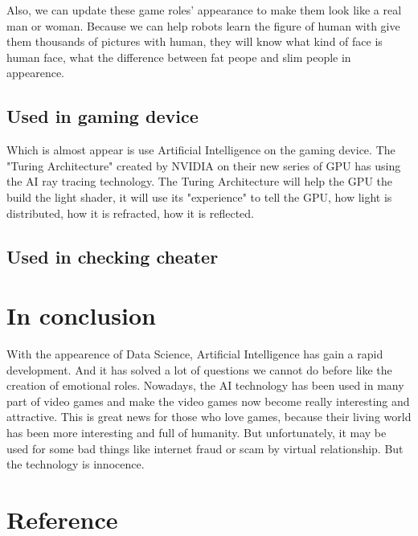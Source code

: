 \documentclass[12pt]{article}
\begin{document}
            Also, we can update these game roles' appearance to make them look like a real man or woman.
            Because we can help robots learn the figure of human with give them thousands of pictures
            with human, they will know what kind of face is human face, what the difference between
            fat peope and slim people in appearence.
        \subsection{Used in gaming device}
            Which is almost appear is use Artificial Intelligence on the gaming device. The "Turing
            Architecture" created by NVIDIA on their new series of GPU has using the AI ray tracing
            technology. The Turing Architecture will help the GPU the build the light shader, it will
            use its "experience" to tell the GPU, how light is distributed, how it is refracted, how
            it is reflected.
        \subsection{Used in checking cheater}
    \section{In conclusion}
        With the appearence of Data Science, Artificial Intelligence has gain a rapid development. And
        it has solved a lot of questions we cannot do before like the creation of emotional roles. Nowadays,
        the AI technology has been used in many part of video games and make the video games now become
        really interesting and attractive. This is great news for those who love games, because their
        living world has been more interesting and full of humanity. But unfortunately, it may be
        used for some bad things like internet fraud or scam by virtual relationship. But the technology
        is innocence.
    \pagebreak
    \section{Reference}
\end{document}
